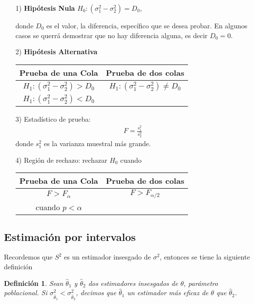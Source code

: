 \documentclass[a4paper]{report} %
\newtheorem{Def}{Definición}[chapter]
\begin{document}
\begin{itemize}
\item[1) ] \textbf{Hip\'otesis Nula} $H_{0}:\left(\sigma^{2}_{1}-\sigma^{2}_{2}\right)=D_{0}$,\medskip

donde $D_{0}$ es el valor, la diferencia, espec\'ifico que se desea probar. En algunos casos se querr\'a demostrar que no hay diferencia alguna, es decir $D_{0}=0$.

\item[2) ] \textbf{Hip\'otesis Alternativa}
\begin{center}
\begin{tabular}{cc}\hline
\textbf{Prueba de una Cola} & \textbf{Prueba de dos colas}\\\hline
$H_{1}:\left(\sigma^{2}_{1}-\sigma^{2}_{2}\right)>D_{0}$ & $H_{1}:\left(\sigma^{2}_{1}-\sigma^{2}_{2}\right)\neq D_{0}$\\ 
$H_{1}:\left(\sigma^{2}_{1}-\sigma^{2}_{2}\right)<D_{0}$&\\
\end{tabular}
\end{center}
\item[3) ] Estad\'istico de prueba:
\begin{eqnarray}F=\frac{s_{1}^{2}}{s_{2}^{2}}\end{eqnarray}
donde $s_{1}^{2}$ es la varianza muestral m\'as grande.
\item[4) ] Regi\'on de rechazo: rechazar $H_{0}$ cuando
\begin{center}
\begin{tabular}{cc}\hline
\textbf{Prueba de una Cola} & \textbf{Prueba de dos colas}\\\hline
$F>F_{\alpha}$ & $F>F_{\alpha/2}$\\
 cuando $p<\alpha$&\\
\end{tabular}
\end{center}
\end{itemize}

\subsection{Estimaci\'on por intervalos}

Recordemos que $S^{2}$ es un estimador insesgado de $\sigma^{2}$, entonces se tiene la siguiente definici\'on 
\begin{Def}
Sean $\hat{\theta}_{1}$ y $\hat{\theta}_{2}$ dos estimadores insesgados de $\theta$, par\'ametro poblacional. Si $\sigma_{\hat{\theta}_{1}}^{2}<\sigma_{\hat{\theta}_{2}}^{2}$, decimos que $\hat{\theta}_{1}$ un estimador m\'as eficaz de $\theta$ que $\hat{\theta}_{2}$.
\end{Def}
\end{document}
